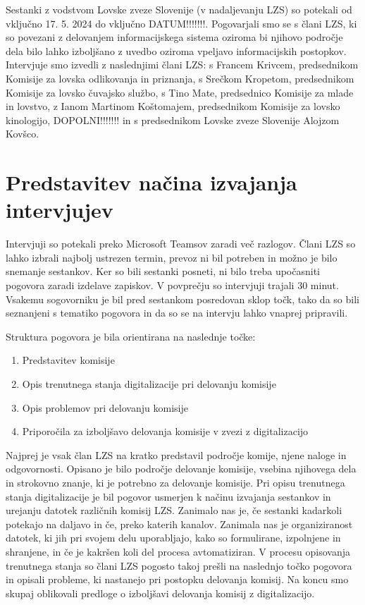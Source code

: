 \documentclass[a4paper,12pt,openright]{book}
\begin{document}
Sestanki z vodstvom Lovske zveze Slovenije (v nadaljevanju LZS) so potekali od vključno 17. 5. 2024 do vključno DATUM!!!!!!!. 
Pogovarjali smo se s člani LZS, ki so povezani z delovanjem informacijskega sistema oziroma bi njihovo področje dela bilo lahko izboljšano z uvedbo oziroma vpeljavo informacijskih postopkov.
Intervjuje smo izvedli z naslednjimi člani LZS: s Francem Krivcem, predsednikom Komisije za lovska odlikovanja in priznanja, s Srečkom Kropetom, predsednikom Komisije za lovsko čuvajsko službo, s Tino Mate, predsednico Komisije za mlade in lovstvo, z Ianom Martinom Koštomajem, predsednikom Komisije za lovsko kinologijo, DOPOLNI!!!!!!! in s predsednikom Lovske zveze Slovenije Alojzom Kovšco. 

\section{Predstavitev načina izvajanja intervjujev}

Intervjuji so potekali preko Microsoft Teamsov zaradi več razlogov. 
Člani LZS so lahko izbrali najbolj ustrezen termin, prevoz ni bil potreben in možno je bilo snemanje sestankov.
Ker so bili sestanki posneti, ni bilo treba upočasniti pogovora zaradi izdelave zapiskov.
V povprečju so intervjuji trajali 30 minut.
Vsakemu sogovorniku je bil pred sestankom posredovan sklop točk, tako da so bili seznanjeni s tematiko pogovora in da so se na intervju lahko vnaprej pripravili. 

Struktura pogovora je bila orientirana na naslednje točke:
\begin{enumerate}
    \item Predstavitev komisije
    \item Opis trenutnega stanja digitalizacije pri delovanju komisije
    \item Opis problemov pri delovanju komisije
    \item Priporočila za izboljšavo delovanja komisije v zvezi z digitalizacijo
\end{enumerate}


Najprej je vsak član LZS na kratko predstavil področje komije, njene naloge in odgovornosti. 
Opisano je bilo področje delovanje komisije, vsebina njihovega dela in strokovno znanje, ki je potrebno za delovanje komisije. 
Pri opisu trenutnega stanja digitalizacije je bil pogovor usmerjen k načinu izvajanja sestankov in urejanju datotek različnih komisij LZS. 
Zanimalo nas je, če sestanki kadarkoli potekajo na daljavo in če, preko katerih kanalov. 
Zanimala nas je organiziranost datotek, ki jih pri svojem delu uporabljajo, kako so formulirane, izpolnjene in shranjene, in če je kakršen koli del procesa avtomatiziran.
V procesu opisovanja trenutnega stanja so člani LZS pogosto takoj prešli na naslednjo točko pogovora in opisali probleme, ki nastanejo pri postopku delovanja komisij. 
Na koncu smo skupaj oblikovali predloge o izboljšavi delovanja komisij z digitalizacijo. 
\end{document}
